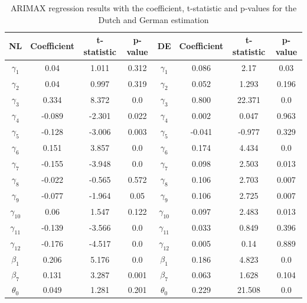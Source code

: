 \begin{table}[]
    \centering
    \begin{tabular}{|c|c c c||c|c c c|}\hline
        NL & Coefficient & t-statistic & p-value & DE & Coefficient & t-statistic & p-value\\\hline
        $\gamma_{1}$ & 0.04 & 1.011 & 0.312 & $\gamma_{1}$ & 0.086 & 2.17 & 0.03\\
        $\gamma_{2}$ & 0.04 & 0.997 & 0.319 & $\gamma_{2}$ & 0.052 & 1.293 & 0.196\\
        $\gamma_{3}$ & 0.334 & 8.372 & 0.0 & $\gamma_{3}$ & 0.800 & 22.371 & 0.0\\
        $\gamma_{4}$ & -0.089 & -2.301 & 0.022 & $\gamma_{4}$ & 0.002 & 0.047 & 0.963\\
        $\gamma_{5}$ & -0.128 & -3.006 & 0.003 & $\gamma_{5}$ & -0.041 & -0.977 & 0.329\\
        $\gamma_{6}$ & 0.151 & 3.857 & 0.0 & $\gamma_{6}$ & 0.174 & 4.434 & 0.0\\
        $\gamma_{7}$ & -0.155 & -3.948 & 0.0 & $\gamma_{7}$ & 0.098 & 2.503 & 0.013\\
        $\gamma_{8}$ & -0.022 & -0.565 & 0.572 & $\gamma_{8}$ & 0.106 & 2.703 & 0.007\\
        $\gamma_{9}$ & -0.077 & -1.964 & 0.05 & $\gamma_{9}$ & 0.106 & 2.725 & 0.007\\
        $\gamma_{10}$ & 0.06 & 1.547 & 0.122 & $\gamma_{10}$ & 0.097 & 2.483 & 0.013\\
        $\gamma_{11}$ & -0.139 & -3.566 & 0.0 & $\gamma_{11}$ & 0.033 & 0.849 & 0.396\\
        $\gamma_{12}$ & -0.176 & -4.517 & 0.0 & $\gamma_{12}$ & 0.005 & 0.14 & 0.889\\
        $\beta_{1}$ & 0.206 & 5.176 & 0.0 &$\beta_{1}$ & 0.186 & 4.823 & 0.0\\
        $\beta_{7}$ & 0.131 & 3.287 & 0.001 & $\beta_{7}$ & 0.063 & 1.628 & 0.104\\
        $\theta_{0}$ & 0.049 & 1.281 & 0.201 & $\theta_0$ & 0.229 & 21.508 & 0.0\\\hline
    \end{tabular}
    \caption{ARIMAX regression results with the coefficient, t-statistic and p-values for the Dutch and German estimation}
    \label{tab:arimax_estimation}
\end{table}
